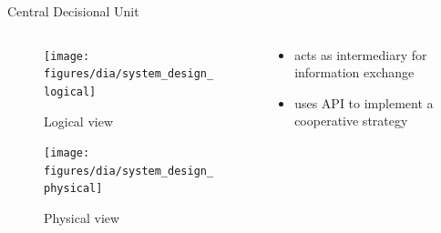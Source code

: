 \documentclass[\HandoutMode,table]{beamer}
\begin{document}
\begin{frame}
    {Central Decisional Unit}
    \begin{columns}
        \begin{column}{.5\textwidth}
            \begin{figure}
                \texttt{[image: figures/dia/system\_design\_logical]}
                \caption{Logical view}
            \end{figure}
            \begin{figure}
                \texttt{[image: figures/dia/system\_design\_physical]}
                \caption{Physical view}
            \end{figure}
        \end{column}
        \begin{column}{.5\textwidth}
            \begin{itemize}
                \item{} acts as intermediary for information exchange
                \item{} uses API to implement a cooperative strategy
            \end{itemize}
        \end{column}
    \end{columns}
\end{frame}
\end{document}

